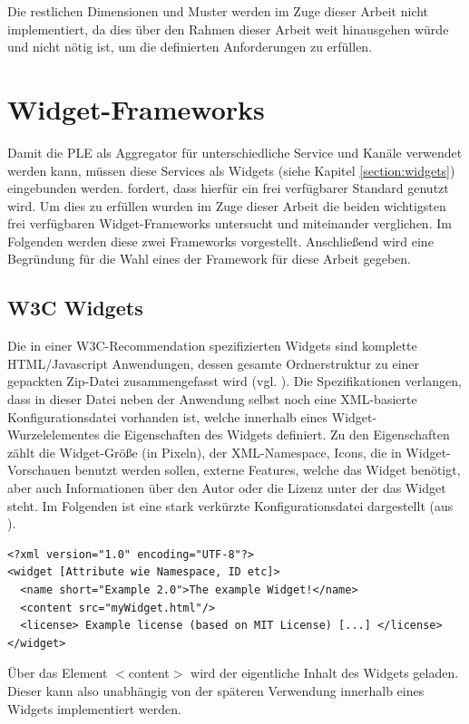 Die restlichen Dimensionen und Muster werden im Zuge dieser Arbeit nicht implementiert, da dies über den Rahmen dieser Arbeit weit hinausgehen würde und nicht nötig ist, um die definierten Anforderungen zu erfüllen.

\section{Widget-Frameworks}\label{section:widget_frameworks}
Damit die PLE als Aggregator für unterschiedliche Service und Kanäle verwendet werden kann, müssen diese Services als Widgets (siehe Kapitel \ref{section:widgets}) eingebunden werden.  fordert, dass hierfür ein frei verfügbarer Standard genutzt wird. Um dies zu erfüllen wurden im Zuge dieser Arbeit die beiden wichtigsten frei verfügbaren Widget-Frameworks untersucht und miteinander verglichen. Im Folgenden werden diese zwei Frameworks vorgestellt. Anschließend wird eine Begründung für die Wahl eines der Framework für diese Arbeit gegeben.

\subsection{W3C Widgets}\label{section:w3c_widgets}
Die in einer W3C-Recommendation spezifizierten Widgets sind komplette HTML/Javascript Anwendungen, dessen gesamte Ordnerstruktur zu einer gepackten Zip-Datei zusammengefasst wird (vgl. \cite{W3C-11-2012}). Die Spezifikationen verlangen, dass in dieser Datei neben der Anwendung selbst noch eine XML-basierte Konfigurationsdatei vorhanden ist, welche innerhalb eines Widget-Wurzelelementes die Eigenschaften des Widgets definiert. Zu den Eigenschaften zählt die Widget-Größe (in Pixeln), der XML-Namespace, Icons, die in Widget-Vorschauen benutzt werden sollen, externe Features, welche das Widget benötigt, aber auch Informationen über den Autor oder die Lizenz unter der das Widget steht. Im Folgenden ist eine stark verkürzte Konfigurationsdatei dargestellt (aus \cite{W3C-11-2012}).
\begin{lstlisting}
<?xml version="1.0" encoding="UTF-8"?>
<widget [Attribute wie Namespace, ID etc]>
  <name short="Example 2.0">The example Widget!</name>
  <content src="myWidget.html"/>
  <license> Example license (based on MIT License) [...] </license>
</widget>
\end{lstlisting}
Über das Element $<$content$>$ wird der eigentliche Inhalt des Widgets geladen. Dieser kann also unabhängig von der späteren Verwendung innerhalb eines Widgets implementiert werden.

